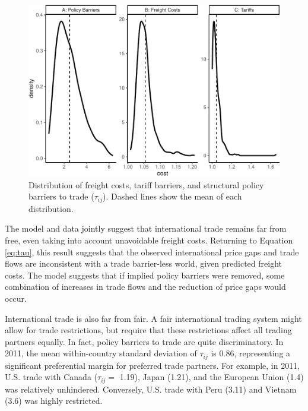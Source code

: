 \documentclass{puthesis}
\begin{document}
\begin{figure}
\centering
\includegraphics{figure/tcosts-1.pdf}
\caption{Distribution of freight costs, tariff barriers, and structural
policy barriers to trade (\(\tau_{ij}\)). Dashed lines show the mean of
each distribution. \label{fig:tcosts}}
\end{figure}

The model and data jointly suggest that international trade remains far
from free, even taking into account unavoidable freight costs. Returning
to Equation \ref{eq:tau}, this result suggests that the observed
international price gaps and trade flows are inconsistent with a trade
barrier-less world, given predicted freight costs. The model suggests
that if implied policy barriers were removed, some combination of
increases in trade flows and the reduction of price gaps would occur.

International trade is also far from fair. A fair international trading
system might allow for trade restrictions, but require that these
restrictions affect all trading partners equally. In fact, policy
barriers to trade are quite discriminatory. In 2011, the mean
within-country standard deviation of \(\tau_{ij}\) is 0.86, representing
a significant preferential margin for preferred trade partners. For
example, in 2011, U.S. trade with Canada (\(\tau_{ij} =\) 1.19), Japan
(1.21), and the European Union (1.4) was relatively unhindered.
Conversely, U.S. trade with Peru (3.11) and Vietnam (3.6) was highly
restricted.
\end{document}
